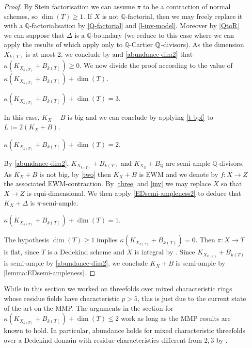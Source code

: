 \begin{proof}
	By Stein factorisation we can assume $\pi$ to be a contraction of normal schemes, so $\dim(T) \geq 1$.
	If $X$ is not $\mathbb{Q}$-factorial, then we may freely replace it with a $\mathbb{Q}$-factorialisation by \autoref{Q-factorial} and \autoref{l-inv-model}. Moreover by \autoref{QtoR} we can suppose that $\Delta$ is a $\mathbb{Q}$-boundary (we reduce to this case where we can apply the results of \cite{witaszek2020keels} which apply only to $\mathbb{Q}$-Cartier $\mathbb{Q}$-divisors).
	As the dimension $X_{k(T)}$ is at most 2, we conclude by \cite[Lemma 9.22]{bhatt2020} and \autoref{abundance-dim2} that $\kappa(K_{X_{k(T)}}+B_{k(T)}) \geq 0$. We now divide the proof according to the value of $\kappa(K_{X_{k(T)}}+B_{k(T)})+\dim (T)$.
	
	\begin{case} 
		$\kappa(K_{X_{k(T)}}+B_{k(T)})+\dim (T)=3$.
	\end{case}
	In this case, $K_X+B$ is big and we can conclude by applying \autoref{t-bpf} to $L:=2(K_{X}+B)$.
	
	\begin{case}
		$\kappa(K_{X_{k(T)}}+B_{k(T)})+\dim (T)=2$.
	\end{case}
	By \autoref{abundance-dim2},  $K_{X_{k(T)}}+B_{k(T)}$ and $K_{X_\mathbb{Q}}+B_{\mathbb{Q}}$ are semi-ample $\mathbb{Q}$-divisors. As $K_X+B$ is not big, by \autoref{two} then $K_X+B$ is EWM and we denote by $f \colon X \to Z$ the associated EWM-contraction.
	By \autoref{three} and \autoref{inv} we may replace $X$ so that $X \to Z$ is equi-dimensional. We then apply \autoref{EDsemi-ampleness2} to deduce that $K_{X}+\Delta$ is $\pi$-semi-ample.
	
	\begin{case}
		$\kappa(K_{X_{k(T)}}+B_{k(T)})+\dim (T)=1$.
	\end{case} 
	The hypothesis $\dim (T) \geq 1$ implies  $\kappa(K_{X_{k(T)}}+B_{k(T)})=0$. Then $\pi \colon X \to T$ is flat, since $T$ is a Dedekind scheme and $X$ is integral by \cite[Proposition 9.7]{Ha77}. Since $K_{X_{{k(T)}}}+ B_{{k(T)}}$ is semi-ample by \autoref{abundance-dim2}, we conclude $K_X+B$ is semi-ample by \autoref{lemma:EDsemi-ampleness}. 
\end{proof}
	
	\begin{remark}
		While in this section we worked on threefolds over mixed characteristic rings whose residue fields have characteristic $p> 5$, this is just due to the current state of the art on the MMP. 
		The arguments in the section for $\kappa(K_{X_{k(T)}}+B_{k(T)})+\dim(T) \leq 2$ work as long as the MMP results are known to hold.
		In particular, abundance holds for mixed characteristic threefolds over a Dedekind domain with residue characteristics different from $2, 3$ by \cite{XX22}.
	\end{remark}
	
